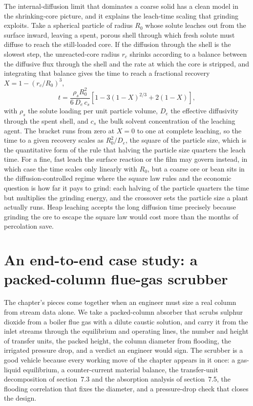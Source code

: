 The internal-diffusion limit that dominates a coarse solid has a clean model in
the shrinking-core picture, and it explains the leach-time scaling that grinding
exploits. Take a spherical particle of radius $R_0$ whose solute leaches out
from the surface inward, leaving a spent, porous shell through which fresh
solute must diffuse to reach the still-loaded core. If the diffusion through the
shell is the slowest step, the unreacted-core radius $r_c$ shrinks according to
a balance between the diffusive flux through the shell and the rate at which the
core is stripped, and integrating that balance gives the time to reach a
fractional recovery $X = 1 - (r_c/R_0)^3$,
\[
t = \frac{\rho_s R_0^2}{6\,D_e\,c_s}\left[1 - 3(1 - X)^{2/3} + 2(1 - X)\right],
\]
with $\rho_s$ the solute loading per unit particle volume, $D_e$ the effective
diffusivity through the spent shell, and $c_s$ the bulk solvent concentration
of the leaching agent. The bracket runs from zero at $X = 0$ to one at complete
leaching, so the time to a given recovery scales as $R_0^2/D_e$, the square of
the particle size, which is the quantitative form of the rule that halving the
particle size quarters the leach time. For a fine, fast leach the surface
reaction or the film may govern instead, in which case the time scales only
linearly with $R_0$, but a coarse ore or bean sits in the diffusion-controlled
regime where the square law rules and the economic question is how far it pays
to grind: each halving of the particle quarters the time but multiplies the
grinding energy, and the crossover sets the particle size a plant actually runs.
Heap leaching accepts the long diffusion time precisely because grinding the ore
to escape the square law would cost more than the months of percolation save.

\section{An end-to-end case study: a packed-column flue-gas scrubber}

The chapter's pieces come together when an engineer must size a real
column from stream data alone. We take a packed-column absorber that
scrubs sulphur dioxide from a boiler flue gas with a dilute caustic
solution, and carry it from the inlet streams through the equilibrium
and operating lines, the number and height of transfer units, the
packed height, the column diameter from flooding, the irrigated
pressure drop, and a verdict an engineer would sign. The scrubber is a
good vehicle because every working move of the chapter appears in it
once: a gas-liquid equilibrium, a counter-current material balance, the
transfer-unit decomposition of section~7.3 and the absorption analysis
of section~7.5, the flooding correlation that fixes the diameter, and a
pressure-drop check that closes the design.

